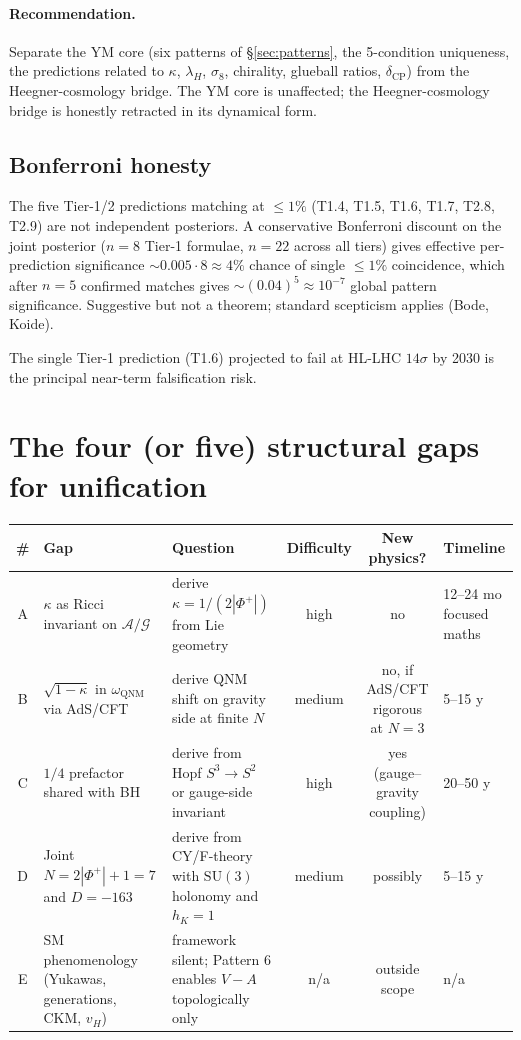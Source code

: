 \documentclass[11pt,a4paper]{article}
\newcommand{\SU}{\mathrm{SU}}
\newcommand{\QNM}{\mathrm{QNM}}
\newcommand{\Phiplus}{\Phi^{+}}
\begin{document}
\paragraph{Recommendation.} Separate the YM core (six patterns of \S\ref{sec:patterns}, the 5-condition uniqueness, the predictions related to $\kappa$, $\lambda_H$, $\sigma_8$, chirality, glueball ratios, $\delta_\mathrm{CP}$) from the Heegner-cosmology bridge. The YM core is unaffected; the Heegner-cosmology bridge is honestly retracted in its dynamical form.

\subsection{Bonferroni honesty}

The five Tier-1/2 predictions matching at $\leq 1\%$ (T1.4, T1.5, T1.6, T1.7, T2.8, T2.9) are not independent posteriors. A conservative Bonferroni discount on the joint posterior ($n = 8$ Tier-1 formulae, $n = 22$ across all tiers) gives effective per-prediction significance $\sim 0.005 \cdot 8 \approx 4\%$ chance of single $\leq 1\%$ coincidence, which after $n = 5$ confirmed matches gives $\sim (0.04)^5 \approx 10^{-7}$ global pattern significance. Suggestive but not a theorem; standard scepticism applies (Bode, Koide).

The single Tier-1 prediction (T1.6) projected to fail at HL-LHC $14\sigma$ by 2030 is the principal near-term falsification risk.

\section{The four (or five) structural gaps for unification}

\begin{center}
\begin{tabularx}{\textwidth}{clXccX}
\toprule
\# & Gap & Question & Difficulty & New physics? & Timeline \\
\midrule
A & $\kappa$ as Ricci invariant on $\mathcal{A}/\mathcal{G}$ & derive $\kappa = 1/(2|\Phiplus|)$ from Lie geometry & high & no & 12--24 mo focused maths \\
B & $\sqrt{1-\kappa}$ in $\omega_\QNM$ via AdS/CFT & derive QNM shift on gravity side at finite $N$ & medium & no, if AdS/CFT rigorous at $N = 3$ & 5--15 y \\
C & $1/4$ prefactor shared with BH & derive from Hopf $S^3 \to S^2$ or gauge-side invariant & high & yes (gauge--gravity coupling) & 20--50 y \\
D & Joint $N = 2|\Phiplus| + 1 = 7$ and $D = -163$ & derive from CY/F-theory with $\SU(3)$ holonomy and $h_K = 1$ & medium & possibly & 5--15 y \\
E & SM phenomenology (Yukawas, generations, CKM, $v_H$) & framework silent; Pattern 6 enables $V - A$ topologically only & n/a & outside scope & n/a \\
\bottomrule
\end{tabularx}
\end{center}
\end{document}
